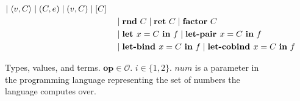 \begin{figure}[tbp]
\begin{alignat*}{3}
         \mid \langle v, C \rangle
         \mid (C, e)
         \mid (v, C)
         \mid [ C ] \\
         & & &
         \mid \mathbf{rnd}~C 
         \mid \mathbf{ret}~C 
         \mid \mathbf{factor}~C \\ 
         & & &
         \mid \textbf{let } x = C \ \textbf{in} \ f
         \mid \textbf{let-pair } x = C \ \textbf{in} \ f \\
         & & &
         \mid \textbf{let-bind } x = C \ \textbf{in} \ f
         \mid \textbf{let-cobind } x = C \ \textbf{in} \ f \\
  \end{alignat*}
  \caption{
    Types, values, and terms. $\mathbf{op} \in \mathcal{O}$. $i \in \{1, 2\}$.
    $\textit{num}$ is a parameter in the programming language representing the
    set of numbers the language computes over.
  }
  \label{fig:syntax}
\end{figure}
